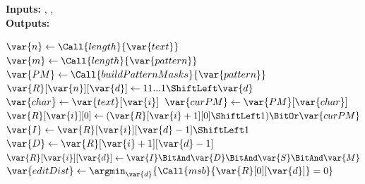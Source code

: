 \caption{GenASM-DC Algorithm}\label{alg:bitap}
\textbf{Inputs:} , ,  \\
\textbf{Outputs:} 

\begin{algorithmic}[1]
    \State $\var{n} \gets \Call{length}{\var{text}}$
    \State $\var{m} \gets \Call{length}{\var{pattern}}$
    \State $\var{PM} \gets \Call{buildPatternMasks}{\var{pattern}}$
    \State
    \State $\var{R}[\var{n}][\var{d}] \gets 11...1 \ShiftLeft \var{d}$ \label{algline:right_init}
    \State
        \State $\var{char} \gets \var{text}[\var{i}]$
        \State $\var{curPM} \gets \var{PM}[\var{char}]$
        \State
        \State $\var{R}[\var{i}][0] \gets (\var{R}[\var{i}+1][0] \ShiftLeft 1) \BitOr \var{curPM}$ \label{algline:top_init}
            \State $\var{I} \gets \var{R}[\var{i}][\var{d}-1] \ShiftLeft 1$ \label{algline:update_rules_start}\label{algline:insertion}
            \State $\var{D} \gets \var{R}[\var{i}+1][\var{d}-1]$\label{algline:deletion}
            \label{algline:substitution}
            \label{algline:match}
            \State $\var{R}[\var{i}][\var{d}] \gets \var{I} \BitAnd \var{D} \BitAnd \var{S} \BitAnd \var{M}$ \label{algline:update_rules_end}
        \EndFor
    \EndFor
    \State
    \State $\var{editDist} \gets \argmin_\var{d}\{\Call{msb}{\var{R}[0][\var{d}]} = 0\}$ \label{algline:edit_dist}
\end{algorithmic}